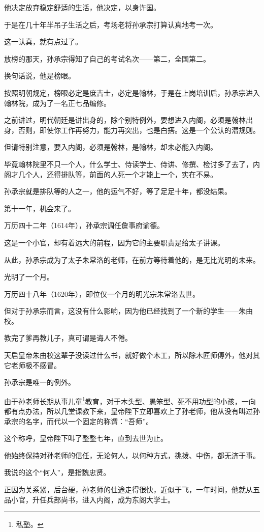 \begin{multicols}{\theparacolNo}
		他决定放弃稳定舒适的生活，他决定，以身许国。

		于是在几十年半吊子生活之后，考场老将孙承宗打算认真地考一次。

		这一认真，就有点过了。

		放榜的那天，孙承宗得知了自己的考试名次——第二，全国第二。

		换句话说，他是榜眼。

		按照明朝规定，榜眼必定是庶吉士，必定是翰林，于是在上岗培训后，孙承宗进入翰林院，成为了一名正七品编修。

		之前讲过，明代朝廷是讲出身的，除个别特例外，要想进入内阁，必须是翰林出身，否则，即使你工作再努力，能力再突出，也是白搭。这是一个公认的潜规则。

		但请特别注意，要入内阁，必须是翰林，是翰林，却未必能入内阁。

		毕竟翰林院里不只一个人，什么学士、侍读学士、侍讲、修撰、检讨多了去了，内阁才几个人，还得排队等，前面的人死一个才能上一个，实在不易。

		孙承宗就是排队等的人之一，他的运气不好，等了足足十年，都没结果。

		第十一年，机会来了。

		万历四十二年（1614年），孙承宗调任詹事府谕德。

		这是一个小官，却有着远大的前程，因为它的主要职责是给太子讲课。

		从此，孙承宗成为了太子朱常洛的老师，在前方等待着他的，是无比光明的未来。

		光明了一个月。

		万历四十八年（1620年），即位仅一个月的明光宗朱常洛去世。

		但对于孙承宗而言，这没有什么影响，因为他已经找到了一个新的学生——朱由校。

		教完了爹再教儿子，真可谓是诲人不倦。

		天启皇帝朱由校这辈子没读过什么书，就好做个木工，所以除木匠师傅外，他对其它老师极不感冒。

		孙承宗是唯一的例外。

		由于孙老师长期从事儿童\footnote{私塾。}教育，对于木头型、愚笨型、死不用功型的小孩，一向都有点办法，所以几堂课教下来，皇帝陛下立即喜欢上了孙老师，他从没有叫过孙承宗的名字，而代以一个固定的称谓：“吾师”。

		这个称呼，皇帝陛下叫了整整七年，直到去世为止。

		他始终保持对孙老师的信任，无论何人，以何种方式，挑拨、中伤，都无济于事。

		我说的这个“何人”，是指魏忠贤。

		正因为关系紧，后台硬，孙老师的仕途走得很快，近似于飞，一年时间，他就从五品小官，升任兵部尚书，进入内阁，成为东阁大学士。


\end{multicols}

